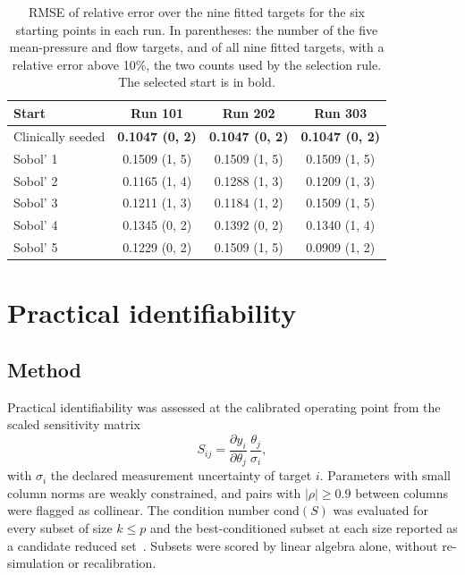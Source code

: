 \documentclass{article}
\begin{document}
\begin{table}[H]
\centering\small
\caption{RMSE of relative error over the nine fitted targets for the six starting points in each run. In parentheses: the number of the five mean-pressure and flow targets, and of all nine fitted targets, with a relative error above 10\%, the two counts used by the selection rule. The selected start is in bold.}
\label{tab:S-multistart}
\begin{tabular}{lccc}
\toprule
\textbf{Start} & \textbf{Run 101} & \textbf{Run 202} & \textbf{Run 303} \\
\midrule
Clinically seeded & \textbf{0.1047 (0, 2)} & \textbf{0.1047 (0, 2)} & \textbf{0.1047 (0, 2)} \\
Sobol' 1 & 0.1509 (1, 5) & 0.1509 (1, 5) & 0.1509 (1, 5) \\
Sobol' 2 & 0.1165 (1, 4) & 0.1288 (1, 3) & 0.1209 (1, 3) \\
Sobol' 3 & 0.1211 (1, 3) & 0.1184 (1, 2) & 0.1509 (1, 5) \\
Sobol' 4 & 0.1345 (0, 2) & 0.1392 (0, 2) & 0.1340 (1, 4) \\
Sobol' 5 & 0.1229 (0, 2) & 0.1509 (1, 5) & 0.0909 (1, 2) \\
\bottomrule
\end{tabular}
\end{table}

\section{Practical identifiability}
\label{sec:S-identifiability}

\subsection{Method}
Practical identifiability was assessed at the calibrated operating point from the scaled sensitivity matrix~\cite{Pope2009,Olufsen2013}
\begin{equation}
S_{ij} = \frac{\partial y_i}{\partial \theta_j}\,\frac{\theta_j}{\sigma_i},
\end{equation}
with $\sigma_i$ the declared measurement uncertainty of target $i$. Parameters with small column norms are weakly constrained, and pairs with $|\rho| \ge 0.9$ between columns were flagged as collinear. The condition number $\mathrm{cond}(S)$ was evaluated for every subset of size $k \le p$ and the best-conditioned subset at each size reported as a candidate reduced set~\cite{vanOsta2020}. Subsets were scored by linear algebra alone, without re-simulation or recalibration.
\end{document}
